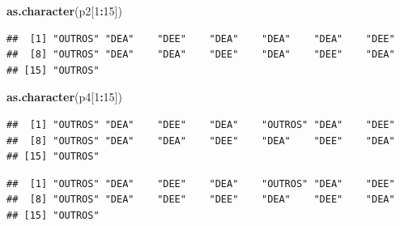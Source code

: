 \documentclass[]{article}
\newenvironment{Shaded}{\begin{snugshade}}{\end{snugshade}}
\newcommand{\KeywordTok}[1]{\textcolor[rgb]{0.13,0.29,0.53}{\textbf{#1}}}
\newcommand{\DecValTok}[1]{\textcolor[rgb]{0.00,0.00,0.81}{#1}}
\newcommand{\StringTok}[1]{\textcolor[rgb]{0.31,0.60,0.02}{#1}}
\newcommand{\FunctionTok}[1]{\textcolor[rgb]{0.00,0.00,0.00}{#1}}
\newcommand{\OperatorTok}[1]{\textcolor[rgb]{0.81,0.36,0.00}{\textbf{#1}}}
\newcommand{\AttributeTok}[1]{\textcolor[rgb]{0.77,0.63,0.00}{#1}}
\newcommand{\NormalTok}[1]{#1}
\begin{document}
\begin{Shaded}
\begin{Highlighting}[]
\KeywordTok{as.character}\NormalTok{(p2[}\DecValTok{1}\OperatorTok{:}\DecValTok{15}\NormalTok{])}
\end{Highlighting}
\end{Shaded}

\begin{verbatim}
##  [1] "OUTROS" "DEA"    "DEE"    "DEA"    "DEA"    "DEA"    "DEE"   
##  [8] "OUTROS" "DEA"    "DEA"    "DEE"    "DEA"    "DEE"    "DEA"   
## [15] "OUTROS"
\end{verbatim}

\begin{Shaded}
\begin{Highlighting}[]
\KeywordTok{as.character}\NormalTok{(p4[}\DecValTok{1}\OperatorTok{:}\DecValTok{15}\NormalTok{])}
\end{Highlighting}
\end{Shaded}

\begin{verbatim}
##  [1] "OUTROS" "DEA"    "DEE"    "DEA"    "OUTROS" "DEA"    "DEE"   
##  [8] "OUTROS" "DEA"    "DEA"    "DEE"    "DEA"    "DEE"    "DEA"   
## [15] "OUTROS"
\end{verbatim}

\begin{Shaded}
\end{Shaded}

\begin{verbatim}
##  [1] "OUTROS" "DEA"    "DEE"    "DEA"    "OUTROS" "DEA"    "DEE"   
##  [8] "OUTROS" "DEA"    "DEE"    "DEE"    "DEA"    "DEE"    "DEA"   
## [15] "OUTROS"
\end{verbatim}

\begin{Shaded}
\end{Shaded}
\end{document}
